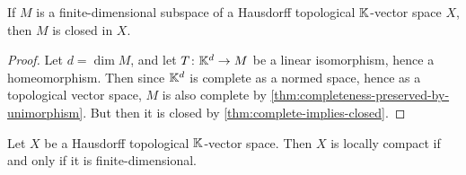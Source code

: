 \documentclass[article, a4paper, 11pt, oneside]{memoir}
\numberwithin{equation}{chapter}
\begin{document}


\begin{corollary}
    \label{thm:finite-dimensional-subspace-closed}
    If $M$ is a finite-dimensional subspace of a Hausdorff topological $\mathbb{K}$-vector space $X$, then $M$ is closed in $X$.
\end{corollary}

\begin{proof}
    Let $d = \dim M$, and let $T \colon \mathbb{K}^d \to M$ be a linear isomorphism, hence a homeomorphism. Then since $\mathbb{K}^d$ is complete as a normed space, hence as a topological vector space, $M$ is also complete by \cref{thm:completeness-preserved-by-unimorphism}. But then it is closed by \cref{thm:complete-implies-closed}.
\end{proof}

\newcommand{\Span}{\operatorname{span}}

\begin{theorem}
    Let $X$ be a Hausdorff topological $\mathbb{K}$-vector space. Then $X$ is locally compact if and only if it is finite-dimensional.
\end{theorem}
\end{document}
